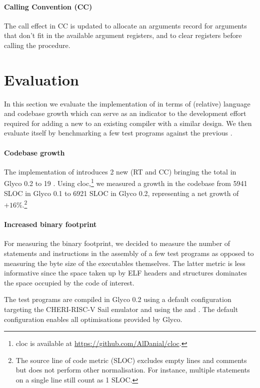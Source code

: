 \documentclass[main.tex]{subfiles}
\begin{document}
\paragraph{Calling Convention (CC)} The call effect in CC is updated to allocate an arguments record for arguments that don't fit in the available argument registers, and to clear registers before calling the procedure.


\section{Evaluation} \label{sct:ghscc-eval}
In this section we evaluate the implementation of  in terms of (relative) language and codebase growth which can serve as an indicator to the development effort required for adding a new  to an existing  compiler with a similar design. We then evaluate  itself by benchmarking a few test programs against the previous .

\paragraph{Codebase growth} The implementation of  introduces 2 new  (RT and CC) bringing the total in Glyco 0.2 to 19 . Using cloc,\footnote{cloc is available at \url{https://github.com/AlDanial/cloc}.} we measured a growth in the codebase from 5941 SLOC in Glyco 0.1 to 6921 SLOC in Glyco 0.2, representing a net growth of $+16\%$.\footnote{The source line of code metric (SLOC) excludes empty lines and comments but does not perform other normalisation. For instance, multiple statements on a single line still count as 1 SLOC.}

\paragraph{Increased binary footprint} For measuring the binary footprint, we decided to measure the number of statements and instructions in the assembly of a few test programs as opposed to measuring the byte size of the executables themselves. The latter metric is less informative since the space taken up by ELF headers and structures dominates the space occupied by the code of interest.

The test programs are compiled in Glyco 0.2 using a default configuration targeting the CHERI-RISC-V Sail emulator and using the  and  . The default configuration enables all optimisations provided by Glyco.
\end{document}
